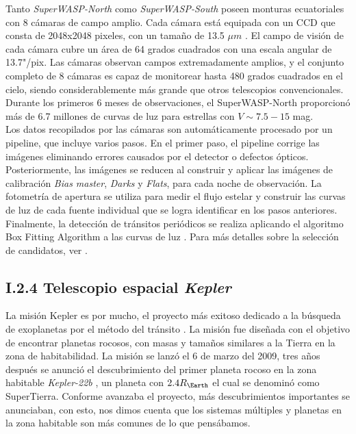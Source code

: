 Tanto \textit{SuperWASP-North} como \textit{SuperWASP-South} poseen monturas ecuatoriales con 8 cámaras de campo amplio. Cada cámara está equipada con un CCD que consta de 2048x2048 pixeles, con un tamaño de 13.5 $	\mu m$ . El campo de visión de cada cámara cubre un área de 64 grados cuadrados con una escala angular de 13.7"/pix. Las cámaras observan campos extremadamente amplios, y el conjunto completo de 8 cámaras es capaz de monitorear hasta 480 grados cuadrados en el cielo, siendo considerablemente más grande que otros telescopios convencionales. Durante los primeros 6 meses de observaciones, el SuperWASP-North proporcionó más de 6.7 millones de curvas de luz para estrellas con $V \sim 7.5-15$ mag.\\


Los datos recopilados por las cámaras son automáticamente procesado por un pipeline, que incluye varios pasos. En el primer paso, el pipeline corrige las imágenes eliminando errores causados por el detector o defectos ópticos. Posteriormente, las imágenes se reducen al construir y aplicar las imágenes de calibración \textit{Bias master}, \textit{Darks} y \textit{Flats}, para cada noche de observación. La fotometría de apertura se utiliza para medir el flujo estelar y construir las curvas de luz de cada fuente individual que se logra identificar en los pasos anteriores. Finalmente, la detección de tránsitos periódicos se realiza aplicando el algoritmo Box Fitting Algorithm a las curvas de luz \cite{kovacs2002box}. Para más detalles sobre la selección de candidatos, ver \cite{collier2006fast}.\\

\subsection*{I.2.4 Telescopio espacial \textit{Kepler}}

La misión Kepler es por mucho, el proyecto más exitoso dedicado a la búsqueda de exoplanetas por el método del tránsito \cite{borucki2010kepler}. La misión fue diseñada con el objetivo de encontrar planetas rocosos, con masas y tamaños similares a la Tierra en la zona de habitabilidad. La misión se lanzó el 6 de marzo del 2009, tres años después se
anunció el descubrimiento del primer planeta rocoso en la zona habitable \textit{Kepler-22b} \cite{borucki2012kepler}, un planeta con $2.4R_{\Earth}$ el cual se denominó como SuperTierra. Conforme avanzaba el proyecto, más descubrimientos importantes se anunciaban, con esto, nos dimos cuenta que los sistemas múltiples y planetas en la zona habitable son más comunes de lo que pensábamos.\\

